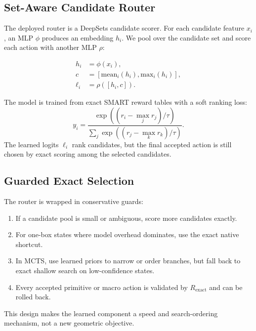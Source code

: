 \documentclass[10pt,twocolumn,letterpaper]{article}
\begin{document}
\subsection{Set-Aware Candidate Router}

The deployed router is a DeepSets candidate scorer.  For each candidate feature
$x_i$, an MLP $\phi$ produces an embedding $h_i$.  We pool over the candidate
set and score each action with another MLP $\rho$:

\begin{align}
  h_i &= \phi(x_i),\\
  c &= [\mathrm{mean}_i(h_i), \mathrm{max}_i(h_i)],\\
  \ell_i &= \rho([h_i, c]).
\end{align}

The model is trained from exact SMART reward tables with a soft ranking loss:
\begin{equation}
  y_i =
  \frac{\exp((r_i-\max_j r_j)/\tau)}
       {\sum_j \exp((r_j-\max_k r_k)/\tau)}.
\end{equation}
The learned logits $\ell_i$ rank candidates, but the final accepted action is
still chosen by exact scoring among the selected candidates.

\subsection{Guarded Exact Selection}

The router is wrapped in conservative guards:

\begin{enumerate}
\item If a candidate pool is small or ambiguous, score more candidates exactly.
\item For one-box states where model overhead dominates, use the exact native
shortcut.
\item In MCTS, use learned priors to narrow or order branches, but fall back to
exact shallow search on low-confidence states.
\item Every accepted primitive or macro action is validated by
$R_{\text{exact}}$ and can be rolled back.
\end{enumerate}

This design makes the learned component a speed and search-ordering mechanism,
not a new geometric objective.
\end{document}
